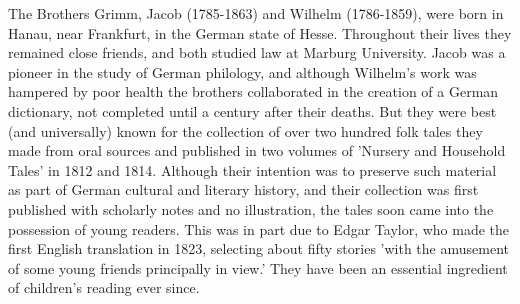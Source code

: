 \documentclass[12pt]{book}
\begin{document}
The Brothers Grimm, Jacob (1785-1863) and Wilhelm (1786-1859), were
born in Hanau, near Frankfurt, in the German state of Hesse.
Throughout their lives they remained close friends, and both studied
law at Marburg University. Jacob was a pioneer in the study of German
philology, and although Wilhelm's work was hampered by poor health the
brothers collaborated in the creation of a German dictionary, not
completed until a century after their deaths. But they were best (and
universally) known for the collection of over two hundred folk tales
they made from oral sources and published in two volumes of 'Nursery
and Household Tales' in 1812 and 1814. Although their intention was to
preserve such material as part of German cultural and literary
history, and their collection was first published with scholarly notes
and no illustration, the tales soon came into the possession of young
readers. This was in part due to Edgar Taylor, who made the first
English translation in 1823, selecting about fifty stories 'with the
amusement of some young friends principally in view.' They have been
an essential ingredient of children's reading ever since.
\end{document}
